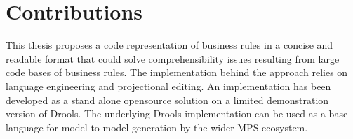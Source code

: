 \section{Contributions}

This thesis proposes a code representation of business rules in a concise and readable format that could solve comprehensibility issues resulting from large code bases of business rules.
The implementation behind the approach relies on language engineering and projectional editing.
An implementation has been developed as a stand alone opensource solution on a limited demonstration version of Drools.
The underlying Drools implementation can be used as a base language for model to model generation by the wider MPS ecosystem.
